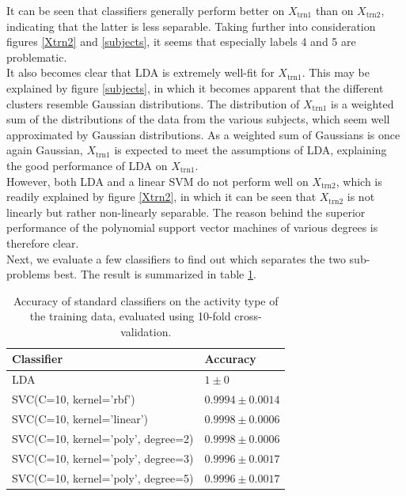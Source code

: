 \documentclass [a4paper] {report}
\begin{document}
	\noindent
	It can be seen that classifiers generally perform better on $X_{\text{trn1}}$ than on $X_{\text{trn2}}$, indicating that the latter is less separable. Taking further into consideration figures \ref{Xtrn2} and \ref{subjects}, it seems that especially labels 4 and 5 are problematic. \\
	It also becomes clear that LDA is extremely well-fit for $X_{\text{trn1}}$. This may be explained by figure \ref{subjects}, in which it becomes apparent that the different clusters resemble Gaussian distributions. The distribution of $X_{\text{trn1}}$ is a weighted sum of the distributions of the data from the various subjects, which seem well approximated by Gaussian distributions. As a weighted sum of Gaussians is once again Gaussian, $X_{\text{trn1}}$ is expected to meet the assumptions of LDA, explaining the good performance of LDA on $X_{\text{trn1}}$. \\
	However, both LDA and a linear SVM do not perform well on $X_{\text{trn2}}$, which is readily explained by figure \ref{Xtrn2}, in which it can be seen that $X_{\text{trn2}}$ is not linearly but rather non-linearly separable. The reason behind the superior performance of the polynomial support vector machines of various degrees is therefore clear.\\
	
	\noindent
	Next, we evaluate a few classifiers to find out which separates the two sub-problems best. The result is summarized in table \ref{tab:separator}.
	
	\begin{table}[H]
		\centering
		\caption{Accuracy of standard classifiers on the activity type of the training data, evaluated using 10-fold cross-validation.}
		\label{tab:separator}
		\begin{tabular}{l|l}
			Classifier 							& Accuracy  \\ \hline
			LDA 								& $1 \pm 0 $\\
			SVC(C=10, kernel='rbf') 			& $0.9994 \pm 0.0014 $\\
			SVC(C=10, kernel='linear') 			& $0.9998 \pm 0.0006 $\\
			SVC(C=10, kernel='poly', degree=2) 	& $0.9998 \pm 0.0006 $\\
			SVC(C=10, kernel='poly', degree=3) 	& $0.9996 \pm 0.0017 $\\
			SVC(C=10, kernel='poly', degree=5) 	& $0.9996 \pm 0.0017 $\\
		\end{tabular}		
	\end{table}
	
\end{document}
